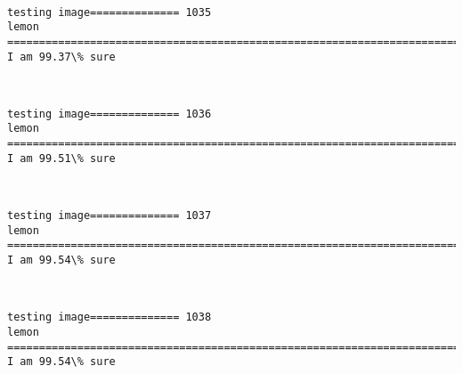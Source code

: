 \documentclass[11pt]{article}
\begin{document}
    \begin{center}
    \end{center}
    { \hspace*{\fill} \\}
    
    \begin{Verbatim}[commandchars=\\\{\}]
testing image============== 1035
lemon
============================================================================
I am 99.37\% sure

    \end{Verbatim}

    \begin{center}
    \end{center}
    { \hspace*{\fill} \\}
    
    \begin{Verbatim}[commandchars=\\\{\}]
testing image============== 1036
lemon
============================================================================
I am 99.51\% sure

    \end{Verbatim}

    \begin{center}
    \end{center}
    { \hspace*{\fill} \\}
    
    \begin{Verbatim}[commandchars=\\\{\}]
testing image============== 1037
lemon
============================================================================
I am 99.54\% sure

    \end{Verbatim}

    \begin{center}
    \end{center}
    { \hspace*{\fill} \\}
    
    \begin{Verbatim}[commandchars=\\\{\}]
testing image============== 1038
lemon
============================================================================
I am 99.54\% sure

    \end{Verbatim}
\end{document}
